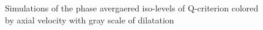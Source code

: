\documentclass[english]{aiaa-tc}
\begin{document}
\begin{figure}
\caption{Simulations of the phase avergaered iso-levels of Q-criterion colored by axial velocity with gray scale of dilatation}\label{isophase}
\end{figure}
\end{document}
